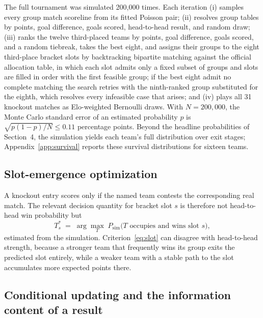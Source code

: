 \documentclass[11pt,letterpaper]{article}
\begin{document}
The full tournament was simulated 200{,}000 times. Each iteration (i) samples every group match scoreline from its fitted Poisson pair; (ii) resolves group tables by points, goal difference, goals scored, head-to-head result, and random draw; (iii) ranks the twelve third-placed teams by points, goal difference, goals scored, and a random tiebreak, takes the best eight, and assigns their groups to the eight third-place bracket slots by backtracking bipartite matching against the official allocation table, in which each slot admits only a fixed subset of groups and slots are filled in order with the first feasible group; if the best eight admit no complete matching the search retries with the ninth-ranked group substituted for the eighth, which resolves every infeasible case that arises; and (iv) plays all 31 knockout matches as Elo-weighted Bernoulli draws. With $N = 200{,}000$, the Monte Carlo standard error of an estimated probability $p$ is $\sqrt{p(1-p)/N} \le 0.11$ percentage points. Beyond the headline probabilities of Section~4, the simulation yields each team's full distribution over exit stages; Appendix~\ref{app:survival} reports these survival distributions for sixteen teams.

\subsection{Slot-emergence optimization}\label{sec:slot}

A knockout entry scores only if the named team contests the corresponding real match. The relevant decision quantity for bracket slot $s$ is therefore not head-to-head win probability but
\begin{equation}
T^\ast_s \;=\; \arg\max_T \; P_{\mathrm{sim}}\bigl(T \text{ occupies and wins slot } s\bigr),
\label{eq:slot}
\end{equation}
estimated from the simulation. Criterion~\eqref{eq:slot} can disagree with head-to-head strength, because a stronger team that frequently wins its group exits the predicted slot entirely, while a weaker team with a stable path to the slot accumulates more expected points there.

\subsection{Conditional updating and the information content of a result}\label{sec:updating}
\end{document}
